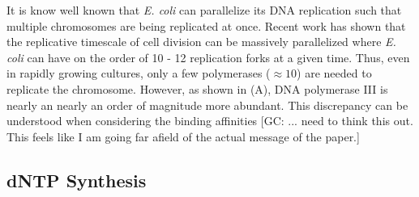 It is know well known that \textit{E. coli} can parallelize its DNA replication
such that multiple chromosomes are being replicated at once. Recent work
\citep{si2017} has shown that the replicative timescale of cell division can be
massively parallelized where \textit{E. coli} can have on the order of 10 - 12
replication forks at a given time.  Thus, even in rapidly growing cultures, only
a few polymerases ($\approx 10$) are needed to replicate the chromosome.
However, as shown in (A), DNA polymerase III is nearly an 
nearly an order of magnitude more abundant. This discrepancy can be understood
when considering the binding affinities  [GC: ... need to think this out. This
feels like I am going far afield of the actual message of the paper.]

\subsection{dNTP Synthesis}